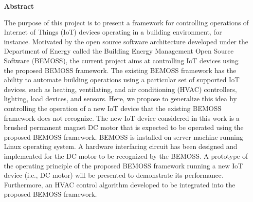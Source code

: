 
\begin{center}\textbf{Abstract}\end{center}


The purpose of this project is to present a framework for controlling operations of Internet of Things (IoT) devices operating in a building environment, for instance.  Motivated by the open source software architecture developed under the Department of Energy called the Building Energy Management Open Source Software (BEMOSS), the current project aims at controlling IoT devices using the proposed BEMOSS framework. The existing BEMOSS framework has the ability to automate building operations using a particular set of supported IoT devices, such as heating, ventilating, and air conditioning (HVAC) controllers, lighting, load devices, and sensors. Here, we propose to generalize this idea by controlling the operation of a new IoT device that the existing BEMOSS framework does not recognize.  The new IoT device considered in this work is a brushed permanent magnet DC motor that is expected to be operated using the proposed BEMOSS framework. BEMOSS is installed on server machine running Linux operating system. A hardware interfacing circuit has been designed and implemented for the DC motor to be recognized by the BEMOSS. A prototype of the operating principle of the proposed BEMOSS framework running a new IoT device (i.e., DC motor) will be presented to demonstrate its performance. Furthermore, an HVAC control algorithm developed to be integrated into the proposed BEMOSS framework. 




\cleardoublepage




